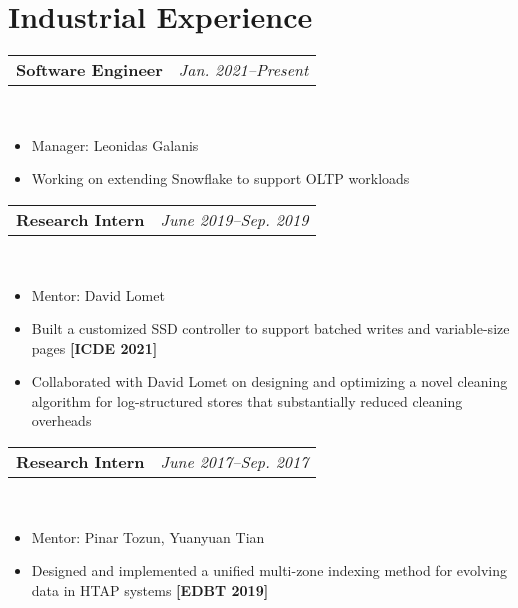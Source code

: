 \documentclass[11pt,a4paper,roman]{moderncv}        %
\makeatletter
\newcommand{\reduce}{\vspace{-0.115in}}
\newcommand{\cvexpr}[5][1em]{
  \begin{tabular*}{\maincolumnwidth}{l@{\extracolsep{\fill}}r}%
    {\textbf{#3}\ifthenelse{\equal{#3}{}}{\textbf{#4}}{, #4}} & {\itshape#2}%
  \end{tabular*}%
  \\
  \begin{minipage}{\maincolumnwidth}%
        #5%
  \end{minipage}%
  \par\addvspace{#1}
}
\makeatother
\begin{document}
\reduce
\reduce

\section{Industrial Experience}
\vspace{-0.05in}
\cvexpr{Jan. 2021--Present}{Software Engineer}{Snowflake Inc.}{
	\begin{itemize}
		\item Manager: Leonidas Galanis
		\item Working on extending Snowflake to support OLTP workloads
	\end{itemize}
}
\reduce
\cvexpr{June 2019--Sep. 2019}{Research Intern}{Microsoft Research, Redmond}{
	\begin{itemize}
		\item Mentor: {David Lomet}
		\item Built a customized SSD controller to support batched writes and variable-size pages \textbf{[ICDE 2021]}
		\item Collaborated with David Lomet on designing and optimizing a novel cleaning algorithm for log-structured stores that substantially
		reduced cleaning overheads
	\end{itemize}
}
\reduce
\cvexpr{June 2017--Sep. 2017}{Research Intern}{IBM Almaden Research Center}{
	\begin{itemize}
		\item Mentor: {Pinar Tozun}, {Yuanyuan Tian}
		\item Designed and implemented a unified multi-zone indexing method for evolving data in HTAP systems \textbf{[EDBT 2019]}
	\end{itemize}
}
\reduce
\reduce
\end{document}
